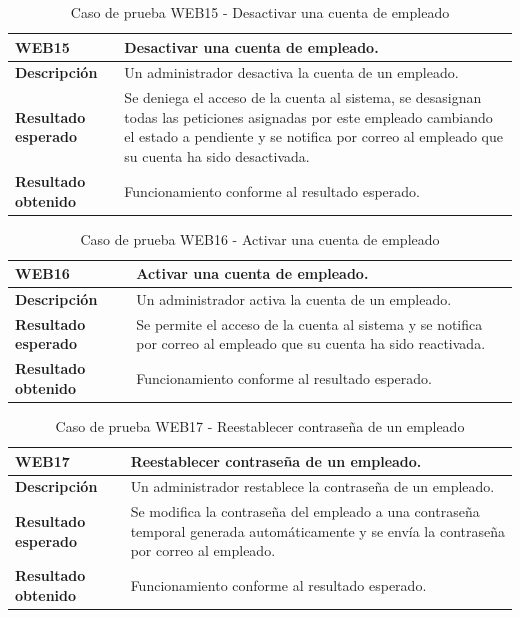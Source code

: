     \begin{table}[H]
        \centering
        \begin{tabular}{|l|p{12cm}|}
        \hline
        \textbf{WEB15} & Desactivar una cuenta de empleado. \\ \hline
        \textbf{Descripción} & Un administrador desactiva la cuenta de un empleado. \\ \hline
        \textbf{Resultado esperado} & Se deniega el acceso de la cuenta al sistema, se desasignan todas las peticiones asignadas por este empleado cambiando el estado a pendiente y se notifica por correo al empleado que su cuenta ha sido desactivada. \\ \hline
        \textbf{Resultado obtenido} & Funcionamiento conforme al resultado esperado. \\ \hline
        \end{tabular}
        \caption{Caso de prueba WEB15 - Desactivar una cuenta de empleado}
    \end{table}

    \begin{table}[H]
        \centering
        \begin{tabular}{|l|p{12cm}|}
        \hline
        \textbf{WEB16} & Activar una cuenta de empleado. \\ \hline
        \textbf{Descripción} & Un administrador activa la cuenta de un empleado. \\ \hline
        \textbf{Resultado esperado} & Se permite el acceso de la cuenta al sistema y se notifica por correo al empleado que su cuenta ha sido reactivada. \\ \hline
        \textbf{Resultado obtenido} & Funcionamiento conforme al resultado esperado. \\ \hline
        \end{tabular}
        \caption{Caso de prueba WEB16 - Activar una cuenta de empleado}
    \end{table}

    \begin{table}[H]
        \centering
        \begin{tabular}{|l|p{12cm}|}
        \hline
        \textbf{WEB17} & Reestablecer contraseña de un empleado. \\ \hline
        \textbf{Descripción} & Un administrador restablece la contraseña de un empleado. \\ \hline
        \textbf{Resultado esperado} & Se modifica la contraseña del empleado a una contraseña temporal generada automáticamente y se envía la contraseña por correo al empleado.  \\ \hline
        \textbf{Resultado obtenido} & Funcionamiento conforme al resultado esperado. \\ \hline
        \end{tabular}
        \caption{Caso de prueba WEB17 - Reestablecer contraseña de un empleado}
    \end{table}

